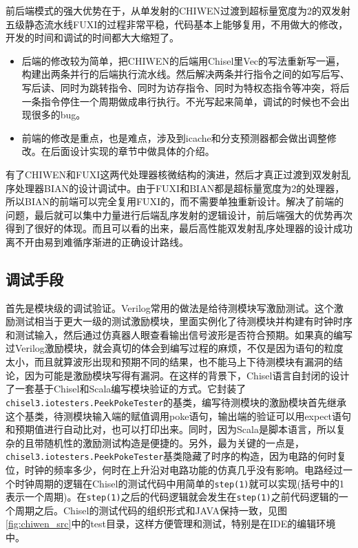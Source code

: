 	前后端模式的强大优势在于，从单发射的CHIWEN过渡到超标量宽度为2的双发射五级静态流水线FUXI的过程非常平稳，代码基本上能够复用，不用做大的修改，开发的时间和调试的时间都大大缩短了。
	\begin{itemize}
		\item 后端的修改较为简单，把CHIWEN的后端用Chisel里Vec的写法重新写一遍，构建出两条并行的后端执行流水线。然后解决两条并行指令之间的如写后写、写后读、同时为跳转指令、同时为访存指令、同时为特权态指令等冲突，将后一条指令停住一个周期做成串行执行。不光写起来简单，调试的时候也不会出现很多的bug。
		\item 前端的修改是重点，也是难点，涉及到icache和分支预测器都会做出调整修改。在后面设计实现的章节中做具体的介绍。
	\end{itemize}
	
	有了CHIWEN和FUXI这两代处理器核微结构的演进，然后才真正过渡到双发射乱序处理器BIAN的设计调试中。由于FUXI和BIAN都是超标量宽度为2的处理器，所以BIAN的前端可以完全复用FUXI的，而不需要单独重新设计。解决了前端的问题，最后就可以集中力量进行后端乱序发射的逻辑设计，前后端强大的优势再次得到了很好的体现。而且可以看的出来，最后高性能双发射乱序处理器的设计成功离不开由易到难循序渐进的正确设计路线。
	
	\subsection{调试手段}
	
	首先是模块级的调试验证。Verilog常用的做法是给待测模块写激励测试。这个激励测试相当于更大一级的测试激励模块，里面实例化了待测模块并构建有时钟时序和测试输入，然后通过仿真器人眼查看输出信号波形是否符合预期。如果真的编写过Verilog激励模块，就会真切的体会到编写过程的麻烦，不仅是因为语句的粒度太小，而且就算波形出现和预期不同的结果，也不能马上下待测模块有漏洞的结论，因为可能是激励模块写得有漏洞。在这样的背景下，Chisel语言自封闭的设计了一套基于Chisel和Scala编写模块验证的方式。它封装了\texttt{chisel3.iotesters.PeekPokeTester}的基类，编写待测模块的激励模块首先继承这个基类，待测模块输入端的赋值调用poke语句，输出端的验证可以用expect语句和预期值进行自动比对，也可以打印出来。同时，因为Scala是脚本语言，所以复杂的且带随机性的激励测试构造是便捷的。另外，最为关键的一点是，\texttt{chisel3.iotesters.PeekPokeTester}基类隐藏了时序的构造，因为电路的何时复位，时钟的频率多少，何时在上升沿对电路功能的仿真几乎没有影响。电路经过一个时钟周期的逻辑在Chisel的测试代码中用简单的\texttt{step(1)}就可以实现(括号中的1表示一个周期)。在\texttt{step(1)}之后的代码逻辑就会发生在\texttt{step(1)}之前代码逻辑的一个周期之后。Chisel的测试代码的组织形式和JAVA保持一致，见图\ref{fig:chiwen_src}中的test目录，这样方便管理和测试，特别是在IDE的编辑环境中。
	
